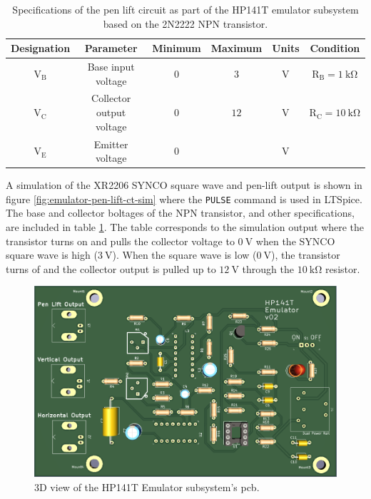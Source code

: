 \documentclass[class=report,11pt,crop=false]{standalone}
\begin{document}
	\begin{table}[h!]
		\centering
		\label{tab:emulator-pen-lift-specs}
		\begin{tabular}{cccccc}
			\hline
			\cellcolor{cyan!25}\textbf{Designation} & \cellcolor{cyan!25}\textbf{Parameter} & \cellcolor{cyan!25}\textbf{Minimum} & \cellcolor{cyan!25}\textbf{Maximum} & \cellcolor{cyan!25}\textbf{Units} &  \cellcolor{cyan!25}\textbf{Condition}\\
			\hline
			$\text{V}_\text{B}$	& Base input voltage & $0$ & $3$ & $\si{\volt}$ & $\text{R}_\text{B} = \SI{1}{\kilo\ohm}$\\ 
			\hline
			$\text{V}_\text{C}$ & Collector output voltage & $0$ & $12$ & $\si{\volt}$ & $\text{R}_\text{C} = \SI{10}{\kilo\ohm}$\\
			\hline
			$\text{V}_\text{E}$ & Emitter voltage & $0$ &	& $\si{\volt}$ &  \\
			\hline
		\end{tabular}
		\caption{Specifications of the pen lift circuit as part of the HP141T emulator subsystem based on the 2N2222 NPN transistor.}
	\end{table}

	A simulation of the XR2206 SYNCO square wave and pen-lift output is shown in figure \ref{fig:emulator-pen-lift-ct-sim} where the \texttt{PULSE} command is used in LTSpice. The base and collector boltages of the NPN transistor, and other specifications, are included in table \ref{tab:emulator-pen-lift-specs}. The table corresponds to the simulation output where the transistor turns on and pulls the collector voltage to $\SI{0}{\volt}$ when the SYNCO square wave is high ($\SI{3}{\volt}$). When the square wave is low ($\SI{0}{\volt}$), the transistor turns of and the collector output is pulled up to $\SI{12}{\volt}$ through the $\SI{10}{\kilo\ohm}$ resistor.  
	
	\begin{figure}[h!]
		\centering
		\includegraphics[width=0.5\linewidth]{Figures/Methodology/emulator-pcb-3d-front-v03}
		\caption{3D view of the HP141T Emulator subsystem's \acrshort{pcb}.}
		\label{fig:emulator-pcb}
	\end{figure}
	
\end{document}

